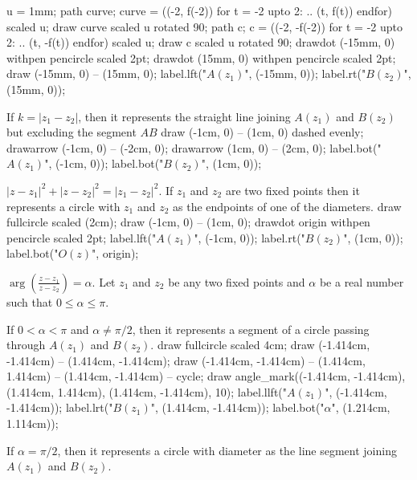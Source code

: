         u = 1mm;
        path curve;
        curve = ((-2, f(-2)) for t =  -2 upto 2: .. (t, f(t)) endfor) scaled u;
        draw curve scaled u rotated 90;
        path c;
        c = ((-2, -f(-2)) for t =  -2 upto 2: .. (t, -f(t)) endfor) scaled u;
        draw c scaled u rotated 90;
        drawdot (-15mm, 0) withpen pencircle scaled 2pt;
        drawdot (15mm, 0) withpen pencircle scaled 2pt;
        draw (-15mm, 0) -- (15mm, 0);
        label.lft("$A(z_1)$", (-15mm, 0));
        label.rt("$B(z_2)$", (15mm, 0));
      \stopMPcode
    \stopplacefigure
  \item If $k = |z_1 - z_2|$, then it represents the straight line joining $A(z_1)$ and $B(z_2)$ but excluding the segment $AB$
    \startplacefigure[location=force]
      \startMPcode
        draw (-1cm, 0) -- (1cm, 0) dashed evenly;
        drawarrow (-1cm, 0) -- (-2cm, 0);
        drawarrow (1cm, 0) -- (2cm, 0);
        label.bot("$A(z_1)$", (-1cm, 0));
        label.bot("$B(z_2)$", (1cm, 0));
      \stopMPcode
    \stopplacefigure
  \stopitemize
\item $|z - z_1|^2 + |z - z_2|^2 = |z_1 - z_2|^2$. If $z_1$ and $z_2$ are two fixed points then it represents a circle with $z_1$
  and $z_2$ as the endpoints of one of the diameters.
  \startplacefigure
    \startMPcode
      draw fullcircle scaled (2cm);
      draw (-1cm, 0) -- (1cm, 0);
      drawdot origin withpen pencircle scaled 2pt;
      label.lft("$A(z_1)$", (-1cm, 0));
      label.rt("$B(z_2)$", (1cm, 0));
      label.bot("$O(z)$", origin);
    \stopMPcode
  \stopplacefigure
\item $\arg\left(\frac{z - z_1}{z - z_2}\right) = \alpha$. Let $z_1$ and $z_2$ be any two fixed points and $\alpha$ be a real
  number such that $0\leq \alpha \leq \pi$.
  \startitemize[i]
  \item If $0 < \alpha < \pi$ and $\alpha \neq \pi/2$, then it represents a segment of a circle passing through $A(z_1)$ and
    $B(z_2)$.
    \startplacefigure
      \startMPcode
        draw fullcircle scaled 4cm;
        draw (-1.414cm, -1.414cm) -- (1.414cm, -1.414cm);
        draw (-1.414cm, -1.414cm) -- (1.414cm, 1.414cm) -- (1.414cm, -1.414cm) -- cycle;
        draw angle_mark((-1.414cm, -1.414cm), (1.414cm, 1.414cm), (1.414cm, -1.414cm), 10);
        label.llft("$A(z_1)$", (-1.414cm, -1.414cm));
        label.lrt("$B(z_1)$", (1.414cm, -1.414cm));
        label.bot("$\alpha$", (1.214cm, 1.114cm));
      \stopMPcode
    \stopplacefigure
  \item If $\alpha = \pi/2$, then it represents a circle with diameter as the line segment joining $A(z_1)$ and $B(z_2)$.
